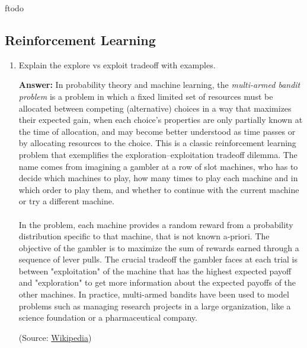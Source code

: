 ƒtodo\documentclass{article}
\newenvironment{QandA}{\begin{enumerate}[label=\arabic*.]}{\end{enumerate}}
\newenvironment{answer}{\par\normalfont \textbf{Answer:}}{}
\begin{document}
\subsection{Reinforcement Learning}
\begin{QandA}
    \item Explain the explore vs exploit tradeoff with examples.
    \begin{answer}
        In probability theory and machine learning, the \textit{multi-armed bandit problem} is a problem in which a fixed limited set of resources must be allocated between competing (alternative) choices in a way that maximizes their expected gain, when each choice's properties are only partially known at the time of allocation, and may become better understood as time passes or by allocating resources to the choice. This is a classic reinforcement learning problem that exemplifies the exploration–exploitation tradeoff dilemma. The name comes from imagining a gambler at a row of slot machines, who has to decide which machines to play, how many times to play each machine and in which order to play them, and whether to continue with the current machine or try a different machine.\\\\
        In the problem, each machine provides a random reward from a probability distribution specific to that machine, that is not known a-priori. The objective of the gambler is to maximize the sum of rewards earned through a sequence of lever pulls. The crucial tradeoff the gambler faces at each trial is between "exploitation" of the machine that has the highest expected payoff and "exploration" to get more information about the expected payoffs of the other machines. In practice, multi-armed bandits have been used to model problems such as managing research projects in a large organization, like a science foundation or a pharmaceutical company.
        
        (Source: \href{https://en.wikipedia.org/wiki/Multi-armed_bandit}{Wikipedia})
    \end{answer}


\end{QandA}
\end{document}

